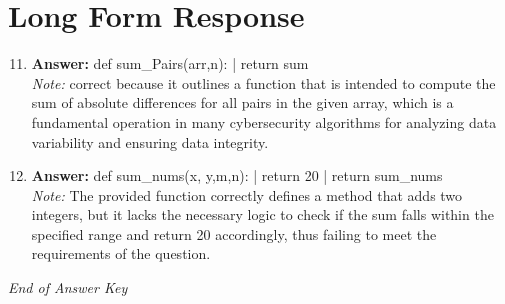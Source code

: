 \documentclass[12pt]{article}
\begin{document}
\section*{Long Form Response}
\begin{enumerate}[label=\arabic*.]
\setcounter{enumi}{10}
\item \textbf{Answer:} def sum\_Pairs(arr,n): | return sum
\\ \textit{Note:} correct because it outlines a function that is intended to compute the sum of absolute differences for all pairs in the given array, which is a fundamental operation in many cybersecurity algorithms for analyzing data variability and ensuring data integrity.
\item \textbf{Answer:} def sum\_nums(x, y,m,n): | return 20 | return sum\_nums
\\ \textit{Note:} The provided function correctly defines a method that adds two integers, but it lacks the necessary logic to check if the sum falls within the specified range and return 20 accordingly, thus failing to meet the requirements of the question.
\end{enumerate}

\vfill
\noindent\textit{End of Answer Key}
\end{document}
